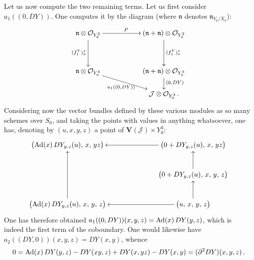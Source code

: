 Let us now compute the two remaining terms. Let us first consider
\(a_{1}((0,DY))\). One computes it by the diagram (where \(\mathfrak{n}\) denotes
\(\mathfrak{n}_{Y_{0}/X_{0}}\)):
\[
\xymatrix@C=5.5em@R=1.55em{
\mathfrak{n}\otimes\OO_{Y_{0}^{2}}
  \ar[r]^{P}
  \ar[dd]_{(f_{1}^{Y})_{0}^{*}}
&
(\mathfrak{n}+\mathfrak{n})\otimes\OO_{Y_{0}^{2}}
  \ar[dd]^{(f_{1}^{Y})_{0}^{*}}
\\
\\
\mathfrak{n}\otimes\OO_{Y_{0}^{3}}
  \ar[dr]_{{a_{1}((0,DY))}}
&
(\mathfrak{n}+\mathfrak{n})\otimes\OO_{Y_{0}^{3}}
  \ar[d]^{{(0,DY)}}
\\
&
\mathcal{J}\otimes\OO_{Y_{0}^{3}}\,.
}
\]
Considering now the vector bundles defined by these various modules as so
many schemes over \(S_{0}\), and taking the points with values in anything
whatsoever, one has, denoting by \((u,x,y,z)\) a point of
\(\mathbf{V}(\mathcal{J})\times Y_{0}^{3}\):
\[
\xymatrix@C=7em@R=2.5em{
\bigl(\Ad(x)\,DY_{y,z}(u),\,x,\,yz\bigr)
&
\bigl(0+DY_{y,z}(u),\,x,\,yz\bigr)
  \ar[l]
\\
&
\bigl(0+DY_{y,z}(u),\,x,\,y,\,z\bigr)
  \ar[u]
\\
\bigl(\Ad(x)\,DY_{y,z}(u),\,x,\,y,\,z\bigr)
  \ar[uu]
&
\bigl(u,\,x,\,y,\,z\bigr)
  \ar[l]
  \ar[u]
}
\]
One has therefore obtained
\(a_{1}((0,DY))(x,y,z)=\operatorname{Ad}(x)\,DY(y,z)\), which is indeed the first term of
the coboundary. One would likewise have
\(a_{2}((DY,0))(x,y,z)=DY(x,y)\), whence%
{\renewcommand{\thefootnote}{(113)}}
\[
0=\operatorname{Ad}(x)\,DY(y,z)-DY(xy,z)+DY(x,yz)-DY(x,y)
=(\partial^{2}DY)(x,y,z)\,.
\]

